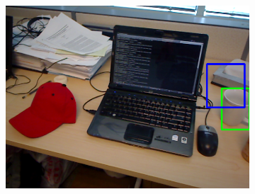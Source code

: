 \begin{figure}
\begin{subfigure}[b]{0.3\textwidth}
		\includegraphics[width=\textwidth]{img/seguimiento_frame_template/frame_template-desk_1-coffee_mug_5-frame_31.png}
	\end{subfigure}


\end{figure}
